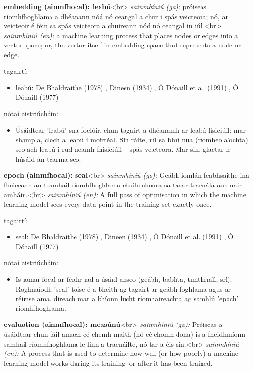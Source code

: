 \documentclass{article}
\begin{document}
\textbf{embedding (ainmfhocal): leabú}<br>
\textit{sainmhíniú (ga):} próiseas ríomhfhoghlama a dhéanann nód nó ceangal a chur i spás veicteora; nó, an veicteoir é féin sa spás veicteora a chuireann nód nó ceangal in iúl.<br>
\textit{sainmhíniú (en):} a machine learning process that places nodes or edges into a vector space; or, the vector itself in embedding space that represents a node or edge.

tagairtí:
\begin{itemize}
	\item leabú: De Bhaldraithe (1978) \cite{de-bhaldraithe}, Dineen (1934) \cite{dineen}, Ó Dónaill et al. (1991) \cite{focloir-beag}, Ó Dónaill (1977) \cite{odonaill}
\end{itemize}

nótaí aistriúcháin:
\begin{itemize}
	\item Úsáidtear 'leabú' sna foclóirí chun tagairt a dhéanamh ar leabú fisiciúil: mar shampla, cloch a leabú i moirtéal. Sin ráite, níl sa bhrí nua (ríomheolaíochta) seo ach leabú i rud neamh-fhisiciúil -- spás veicteora. Mar sin, glactar le húsáid an téarma seo.
\end{itemize}


\textbf{epoch (ainmfhocal): seal}<br>
\textit{sainmhíniú (ga):}  Geábh iomlán feabhsaithe ina fheiceann an tsamhail ríomhfhoghlama chuile shonra sa tacar traenála aon uair amháin.<br>
\textit{sainmhíniú (en):} A full pass of optimisation in which the machine learning model sees every data point in the training set exactly once.

tagairtí:
\begin{itemize}
	\item seal: De Bhaldraithe (1978) \cite{de-bhaldraithe}, Dineen (1934) \cite{dineen}, Ó Dónaill et al. (1991) \cite{focloir-beag}, Ó Dónaill (1977) \cite{odonaill}
\end{itemize}

nótaí aistriúcháin:
\begin{itemize}
	\item Is iomaí focal ar féidir iad a úsáid anseo (geábh, babhta, timthriall, srl). Roghnaíodh 'seal' toisc é a bheith ag tagairt ar geábh foghlama agus ar réimse ama, díreach mar a bhíonn lucht ríomhaireachta ag samhlú 'epoch' ríomhfhoghlama.
\end{itemize}


\textbf{evaluation (ainmfhocal): measúnú}<br>
\textit{sainmhíniú (ga):} Próiseas a úsáidtear chun fáil amach cé chomh maith (nó cé chomh dona) is a fheidhmíonn samhail ríomhfhoghlama le linn a traenáilte, nó tar a éis sin.<br>
\textit{sainmhíniú (en):} A process that is used to determine how well (or how poorly) a machine learning model works during its training, or after it has been trained.
\end{document}
